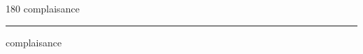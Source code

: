 
\begin{frame}
\begin{center}
\begin{turn}{180}
{\fontsize{2.5cm}{1em}\selectfont complaisance}
\end{turn}
\vspace{1em}\par  
\hrule
\vspace{1em}\par  
{\fontsize{2.5cm}{1em}\selectfont complaisance}
\end{center}
\end{frame}
